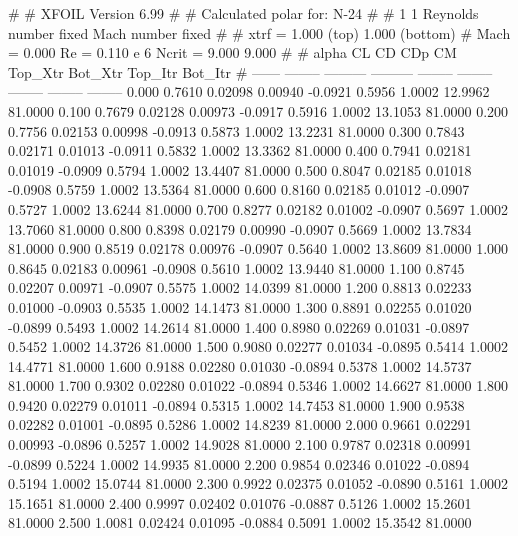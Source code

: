 #  
#       XFOIL         Version 6.99
#  
# Calculated polar for: N-24                                            
#  
# 1 1 Reynolds number fixed          Mach number fixed         
#  
# xtrf =   1.000 (top)        1.000 (bottom)  
# Mach =   0.000     Re =     0.110 e 6     Ncrit =   9.000  9.000
#  
#   alpha    CL        CD       CDp       CM     Top_Xtr  Bot_Xtr  Top_Itr  Bot_Itr
#  ------ -------- --------- --------- -------- -------- -------- -------- --------
   0.000   0.7610   0.02098   0.00940  -0.0921   0.5956   1.0002  12.9962  81.0000
   0.100   0.7679   0.02128   0.00973  -0.0917   0.5916   1.0002  13.1053  81.0000
   0.200   0.7756   0.02153   0.00998  -0.0913   0.5873   1.0002  13.2231  81.0000
   0.300   0.7843   0.02171   0.01013  -0.0911   0.5832   1.0002  13.3362  81.0000
   0.400   0.7941   0.02181   0.01019  -0.0909   0.5794   1.0002  13.4407  81.0000
   0.500   0.8047   0.02185   0.01018  -0.0908   0.5759   1.0002  13.5364  81.0000
   0.600   0.8160   0.02185   0.01012  -0.0907   0.5727   1.0002  13.6244  81.0000
   0.700   0.8277   0.02182   0.01002  -0.0907   0.5697   1.0002  13.7060  81.0000
   0.800   0.8398   0.02179   0.00990  -0.0907   0.5669   1.0002  13.7834  81.0000
   0.900   0.8519   0.02178   0.00976  -0.0907   0.5640   1.0002  13.8609  81.0000
   1.000   0.8645   0.02183   0.00961  -0.0908   0.5610   1.0002  13.9440  81.0000
   1.100   0.8745   0.02207   0.00971  -0.0907   0.5575   1.0002  14.0399  81.0000
   1.200   0.8813   0.02233   0.01000  -0.0903   0.5535   1.0002  14.1473  81.0000
   1.300   0.8891   0.02255   0.01020  -0.0899   0.5493   1.0002  14.2614  81.0000
   1.400   0.8980   0.02269   0.01031  -0.0897   0.5452   1.0002  14.3726  81.0000
   1.500   0.9080   0.02277   0.01034  -0.0895   0.5414   1.0002  14.4771  81.0000
   1.600   0.9188   0.02280   0.01030  -0.0894   0.5378   1.0002  14.5737  81.0000
   1.700   0.9302   0.02280   0.01022  -0.0894   0.5346   1.0002  14.6627  81.0000
   1.800   0.9420   0.02279   0.01011  -0.0894   0.5315   1.0002  14.7453  81.0000
   1.900   0.9538   0.02282   0.01001  -0.0895   0.5286   1.0002  14.8239  81.0000
   2.000   0.9661   0.02291   0.00993  -0.0896   0.5257   1.0002  14.9028  81.0000
   2.100   0.9787   0.02318   0.00991  -0.0899   0.5224   1.0002  14.9935  81.0000
   2.200   0.9854   0.02346   0.01022  -0.0894   0.5194   1.0002  15.0744  81.0000
   2.300   0.9922   0.02375   0.01052  -0.0890   0.5161   1.0002  15.1651  81.0000
   2.400   0.9997   0.02402   0.01076  -0.0887   0.5126   1.0002  15.2601  81.0000
   2.500   1.0081   0.02424   0.01095  -0.0884   0.5091   1.0002  15.3542  81.0000
